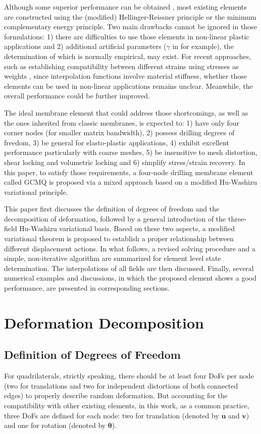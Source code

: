 \documentclass[3p,sort&compress,review,11pt]{elsarticle}
\newcommand*{\mb}{\bm}
\begin{document}
Although some superior performance can be obtained \citep[e.g.,][]{Choi2006,Choo2006,Cen2011}, most existing elements are constructed using the (modified) Hellinger-Reissner principle or the minimum complementary energy principle. Two main drawbacks cannot be ignored in those formulations: 1) there are difficulties to use those elements in non-linear plastic applications and 2) additional artificial parameters ($\gamma$ in \citep{Hughes1989} for example), the determination of which is normally empirical, may exist. For recent approaches, such as establishing compatibility between different strains using stresses as weights \citep{Wang2016,Shang2017}, since interpolation functions involve material stiffness, whether those elements can be used in non-linear applications remains unclear. Meanwhile, the overall performance could be further improved.

The ideal membrane element that could address those shortcomings, as well as the ones inherited from classic membranes, is expected to: 1) have only four corner nodes (for smaller matrix bandwidth), 2) possess drilling degrees of freedom, 3) be general for elasto-plastic applications, 4) exhibit excellent performance particularly with coarse meshes, 5) be insensitive to mesh distortion, shear locking and volumetric locking and 6) simplify stress/strain recovery. In this paper, to satisfy those requirements, a four-node drilling membrane element called GCMQ is proposed via a mixed approach based on a modified Hu-Washizu variational principle.

This paper first discusses the definition of degrees of freedom and the decomposition of deformation, followed by a general introduction of the three-field Hu-Washizu variational basis. Based on these two aspects, a modified variational theorem is proposed to establish a proper relationship between different displacement actions. In what follows, a revised solving procedure and a simple, non-iterative algorithm are summarized for element level state determination. The interpolations of all fields are then discussed. Finally, several numerical examples and discussions, in which the proposed element shows a good performance, are presented in corresponding sections.
\section{Deformation Decomposition}
\subsection{Definition of Degrees of Freedom}
For quadrilaterals, strictly speaking, there should be at least four DoFs per node (two for translations and two for independent distortions of both connected edges) to properly describe random deformation. But accounting for the compatibility with other existing elements, in this work, as a common practice, three DoFs are defined for each node: two for translation (denoted by $\mb{u}$ and $\mb{v}$) and one for rotation (denoted by $\mb{\theta}$).
\end{document}
